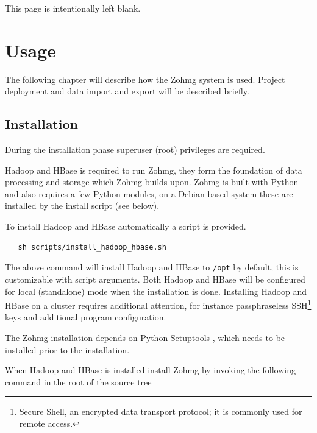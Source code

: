 \pagebreak



 



\appendix


\pagebreak
This page is intentionally left blank.
\pagebreak

\chapter{Usage}


\noindent The following chapter will describe how the Zohmg system is used.
Project deployment and data import and export will be described briefly.


\section*{Installation}

During the installation phase superuser (root) privileges are required.

Hadoop and HBase is required to run Zohmg, they form the foundation of data
processing and storage which Zohmg builds upon. Zohmg is built with Python and
also requires a few Python modules, on a Debian based system these are installed
by the install script (see below).

To install Hadoop and HBase automatically a script is provided.

\begin{verbatim}
   sh scripts/install_hadoop_hbase.sh
\end{verbatim}

The above command will install Hadoop and HBase to \texttt{/opt} by default,
this is customizable with script arguments. Both Hadoop and HBase will be
configured for local (standalone) mode when the installation is done. Installing
Hadoop and HBase on a cluster requires additional attention, for
instance passphraseless SSH\footnote{Secure Shell, an encrypted data transport
protocol; it is commonly used for remote access.} keys and additional program
configuration.

The Zohmg installation depends on Python Setuptools \cite{setuptools}, which
needs to be installed prior to the installation.

When Hadoop and HBase is installed install Zohmg by invoking the following
command in the root of the source tree

